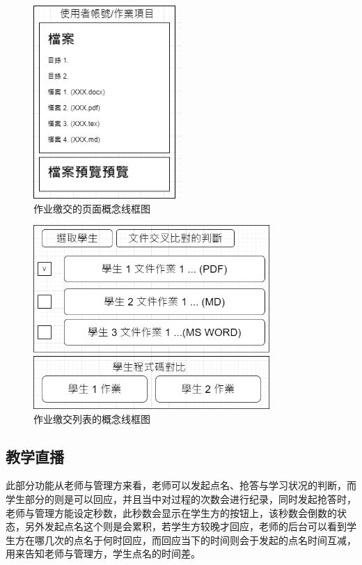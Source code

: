 \begin{figure}[htb]
\centering 
\includegraphics[width=0.50\textwidth]{img/ch1m9.png} 
\caption{作业缴交的页面概念线框图}
\label{Test}
\end{figure}

\begin{figure}[htb]
\centering 
\includegraphics[width=0.80\textwidth]{img/ch1m10.png} 
\caption{作业缴交列表的概念线框图}
\label{Test}
\end{figure}


\subsection{教学直播}

此部分功能从老师与管理方来看，老师可以发起点名、抢答与学习状况的判断，而学生部分的则是可以回应，并且当中对过程的次数会进行纪录，同时发起抢答时，老师与管理方能设定秒数，此秒数会显示在学生方的按钮上，该秒数会倒数的状态，另外发起点名这个则是会累积，若学生方较晚才回应，老师的后台可以看到学生方在哪几次的点名于何时回应，而回应当下的时间则会于发起的点名时间互减，用来告知老师与管理方，学生点名的时间差。


